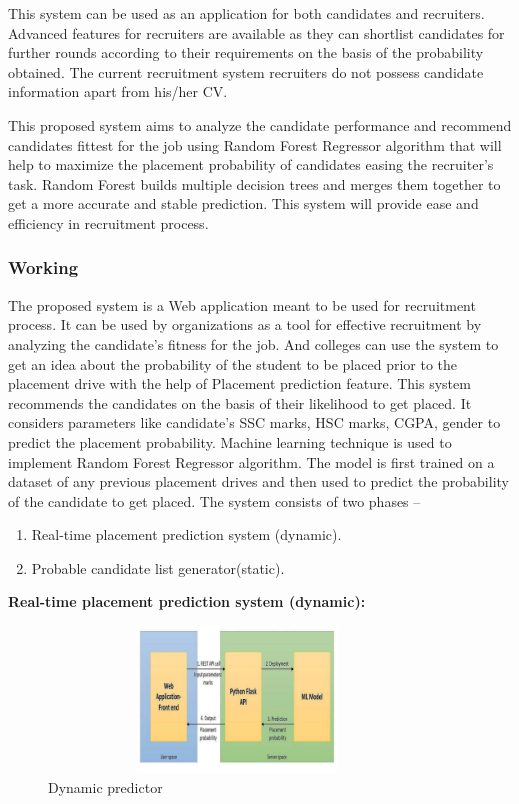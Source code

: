 \documentclass[12pt]{article}
\begin{document}
This system can be used as an application for both candidates and 
recruiters. Advanced features for recruiters are 
available as they can shortlist candidates for further 
rounds according to their requirements on the basis 
of the probability obtained. The current recruitment 
system recruiters do not possess candidate 
information apart from his/her CV. 

This proposed system aims to analyze the candidate performance 
and recommend candidates fittest for the job using 
Random Forest Regressor algorithm that will help to 
maximize the placement probability of candidates 
easing the recruiter’s task. Random Forest builds 
multiple decision trees and merges them together to 
get a more accurate and stable prediction. This 
system will provide ease and efficiency in recruitment 
process.

\newpage
\subsubsection{Working}
The proposed system is a Web application meant 
to be used for recruitment process. It can be used 
by organizations as a tool for effective 
recruitment by analyzing the candidate’s fitness 
for the job. And colleges can use the system to get 
an idea about the probability of the student to be 
placed prior to the placement drive with the help 
of Placement prediction feature. This system 
recommends the candidates on the basis of their 
likelihood to get placed. It considers parameters 
like candidate’s SSC marks, HSC marks, CGPA, 
gender to predict the placement probability. 
Machine learning technique is used to implement 
Random Forest Regressor algorithm. The model 
is first trained on a dataset of any previous 
placement drives and then used to predict the 
probability of the candidate to get placed.
The system consists of two phases – 
\begin{enumerate}
\item Real-time placement prediction system (dynamic).
\item Probable candidate list generator(static).
\end{enumerate}
\textbf{Real-time placement prediction system (dynamic):}

\begin{figure}[H]
\begin{center}
 \includegraphics[width=10cm, height=3.9cm]{L5P1}
\caption{Dynamic predictor }
\end{center}
\end{figure}
\end{document}
